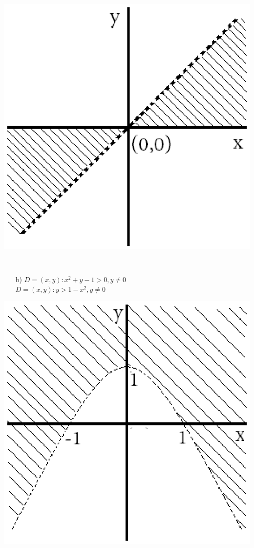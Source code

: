 \documentclass[11pt]{amsbook}
\begin{document}
\begin{enumerate}
\begin{minipage}{0.3\textwidth}
		\includegraphics[width=0.8\linewidth]{images/b2p2-278-4a.eps}
	\end{minipage}%
	\\
	\begin{minipage}{0.6\textwidth}\raggedright
		\begin{enumerate}
		\item[b)]\quad $D = {(x, y): x^2 + y - 1 > 0, y \neq 0}$
		\\\noindent
		\quad $D = {(x, y): y > 1 - x^2 , y \neq 0}$
		\end{enumerate}
	\end{minipage}
	\hfill%
	\begin{minipage}{0.3\textwidth}
		\includegraphics[width=0.8\linewidth]{images/b2p2-278-4b.eps}

\end{minipage}
\end{enumerate}
\end{document}
